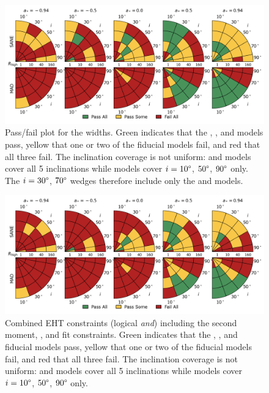 
\begin{figure}
 \centering
 \includegraphics[width=\textwidth]{./figures/Mring_w_Constraints.png}
  \caption{Pass/fail plot for the \mring widths.
    Green indicates that the \kharma, \bhac, and \hamr models pass, yellow that one or two of the fiducial models fail, and red that all three fail.
    The inclination coverage is not uniform: \bhac and \kharma models cover all 5 inclinations while \hamr models cover $i = 10\degree$, $50\degree$, $90\degree$ only.
    The $i = 30\degree$, $70\degree$ wedges therefore include only the \bhac and \kharma models.}
  \label{fig:mring_width_salsa} %
\end{figure}

\begin{figure}
  \centering
  \includegraphics[width=\textwidth]{./figures/Interferometric_Constraints.png}
  \caption{Combined EHT constraints (logical {\em and}) including the second moment, \vam, and \mring fit constraints.
    Green indicates that the \kharma, \bhac, and \hamr fiducial models pass, yellow that one or two of the fiducial models fail, and red that all three fail.
    The inclination coverage is not uniform: \bhac and \kharma models cover all 5 inclinations while \hamr models cover $i = 10\degree$, $50\degree$, $90\degree$ only.}
  \label{fig:all_EHT_constraints} %
\end{figure}

